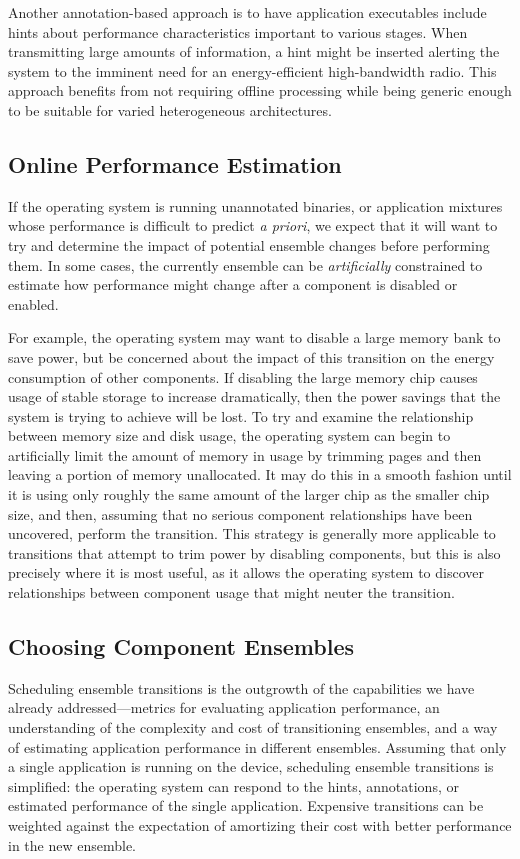 Another annotation-based approach is to have application executables include
hints about performance characteristics important to various stages. When
transmitting large amounts of information, a hint might be inserted alerting
the system to the imminent need for an energy-efficient high-bandwidth radio.
This approach benefits from not requiring offline processing while being
generic enough to be suitable for varied heterogeneous architectures.

\subsection{Online Performance Estimation}

If the operating system is running unannotated binaries, or application
mixtures whose performance is difficult to predict \textit{a priori}, we
expect that it will want to try and determine the impact of potential
ensemble changes before performing them. In some cases, the currently
ensemble can be \textit{artificially} constrained to estimate how performance
might change after a component is disabled or enabled.

For example, the operating system may want to disable a large memory bank to
save power, but be concerned about the impact of this transition on the
energy consumption of other components. If disabling the large memory chip
causes usage of stable storage to increase dramatically, then the power
savings that the system is trying to achieve will be lost. To try and examine
the relationship between memory size and disk usage, the operating system can
begin to artificially limit the amount of memory in usage by trimming pages
and then leaving a portion of memory unallocated. It may do this in a smooth
fashion until it is using only roughly the same amount of the larger chip as
the smaller chip size, and then, assuming that no serious component
relationships have been uncovered, perform the transition. This strategy is
generally more applicable to transitions that attempt to trim power by
disabling components, but this is also precisely where it is most useful, as
it allows the operating system to discover relationships between component
usage that might neuter the transition.

\subsection{Choosing Component Ensembles}

Scheduling ensemble transitions is the outgrowth of the capabilities we have
already addressed---metrics for evaluating application performance, an
understanding of the complexity and cost of transitioning ensembles, and a
way of estimating application performance in different ensembles. Assuming
that only a single application is running on the device, scheduling ensemble
transitions is simplified: the operating system can respond to the hints,
annotations, or estimated performance of the single application. Expensive
transitions can be weighted against the expectation of amortizing their cost
with better performance in the new ensemble.

